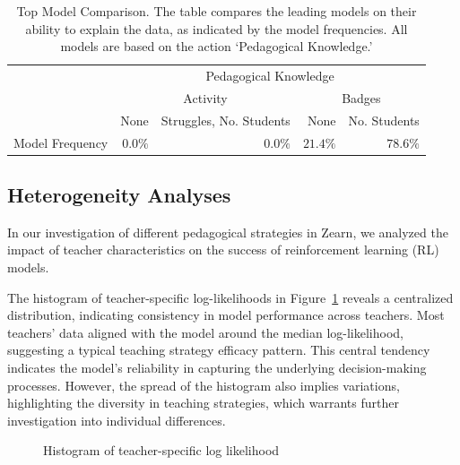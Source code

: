 \documentclass[
  number,
  preprint,
  3p,
  onecolumn]{elsarticle}
\begin{document}
\begin{longtable}{l|rrrr}

\caption{\label{tbl-CBM-final}Top Model Comparison. The table compares
the leading models on their ability to explain the data, as indicated by
the model frequencies. All models are based on the action `Pedagogical
Knowledge.'}

\tabularnewline

\toprule
\multicolumn{1}{l}{} & \multicolumn{4}{c}{Pedagogical Knowledge} \\ 
\cmidrule(lr){2-5}
\multicolumn{1}{l}{} & \multicolumn{2}{c}{Activity} & \multicolumn{2}{c}{Badges} \\ 
\cmidrule(lr){2-3} \cmidrule(lr){4-5}
\multicolumn{1}{l}{} & None & Struggles, No. Students & None & No. Students \\ 
\midrule\addlinespace[2.5pt]
Model Frequency & $0.0\%$ & $0.0\%$ & $21.4\%$ & $78.6\%$ \\ 
\bottomrule

\end{longtable}

\subsection{Heterogeneity Analyses}\label{heterogeneity-analyses}

In our investigation of different pedagogical strategies in Zearn, we
analyzed the impact of teacher characteristics on the success of
reinforcement learning (RL) models.

The histogram of teacher-specific log-likelihoods in
Figure~\ref{fig-loglik-histogram} reveals a centralized distribution,
indicating consistency in model performance across teachers. Most
teachers' data aligned with the model around the median log-likelihood,
suggesting a typical teaching strategy efficacy pattern. This central
tendency indicates the model's reliability in capturing the underlying
decision-making processes. However, the spread of the histogram also
implies variations, highlighting the diversity in teaching strategies,
which warrants further investigation into individual differences.

\begin{figure}


\caption{\label{fig-loglik-histogram}Histogram of teacher-specific log
likelihood}

\end{figure}%
\end{document}
